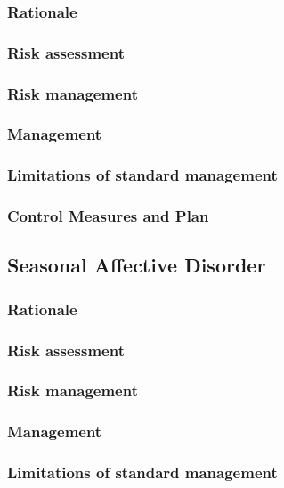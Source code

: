 \documentclass[12pt,a4paper]{article}
\begin{document}
\subsubsection{Rationale}

\subsubsection{Risk assessment}

\subsubsection{Risk management}

\subsubsection{Management}

\subsubsection{Limitations of standard management}

\subsubsection{Control Measures and Plan}

\subsection{Seasonal Affective Disorder}

\subsubsection{Rationale}

\subsubsection{Risk assessment}

\subsubsection{Risk management}

\subsubsection{Management}

\subsubsection{Limitations of standard management}
\end{document}
